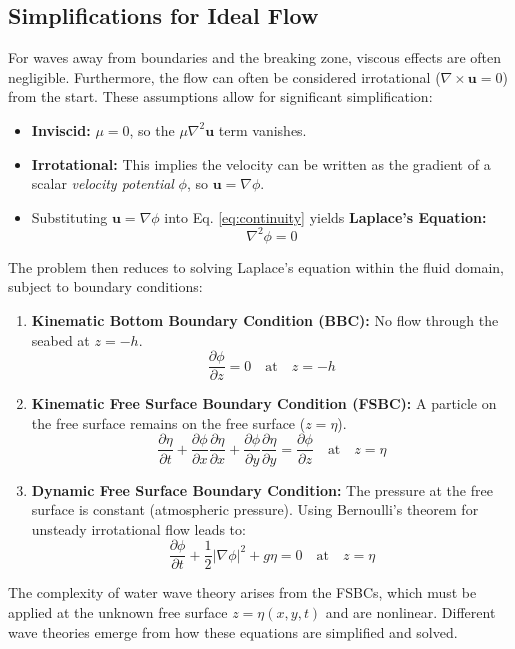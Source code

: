 \documentclass[11pt,a4paper]{article}
\begin{document}
\subsection{Simplifications for Ideal Flow}
For waves away from boundaries and the breaking zone, viscous effects are often negligible. Furthermore, the flow can often be considered irrotational ($\nabla \times \mathbf{u} = 0$) from the start. These assumptions allow for significant simplification:
\begin{itemize}
    \item \textbf{Inviscid:} $\mu = 0$, so the $\mu \nabla^2 \mathbf{u}$ term vanishes.
    \item \textbf{Irrotational:} This implies the velocity can be written as the gradient of a scalar \emph{velocity potential} $\phi$, so $\mathbf{u} = \nabla \phi$.
    \item Substituting $\mathbf{u} = \nabla \phi$ into Eq. \ref{eq:continuity} yields \textbf{Laplace's Equation:}
        \begin{equation}
        \nabla^2 \phi = 0
        \label{eq:laplace}
        \end{equation}
\end{itemize}
The problem then reduces to solving Laplace's equation within the fluid domain, subject to boundary conditions:
\begin{enumerate}
    \item \textbf{Kinematic Bottom Boundary Condition (BBC):} No flow through the seabed at $z = -h$.
        \begin{equation}
        \frac{\partial \phi}{\partial z} = 0 \quad \text{at} \quad z = -h
        \end{equation}
    \item \textbf{Kinematic Free Surface Boundary Condition (FSBC):} A particle on the free surface remains on the free surface ($z = \eta$).
        \begin{equation}
        \frac{\partial \eta}{\partial t} + \frac{\partial \phi}{\partial x}\frac{\partial \eta}{\partial x} + \frac{\partial \phi}{\partial y}\frac{\partial \eta}{\partial y} = \frac{\partial \phi}{\partial z} \quad \text{at} \quad z = \eta
        \end{equation}
    \item \textbf{Dynamic Free Surface Boundary Condition:} The pressure at the free surface is constant (atmospheric pressure). Using Bernoulli's theorem for unsteady irrotational flow leads to:
        \begin{equation}
        \frac{\partial \phi}{\partial t} + \frac{1}{2}|\nabla \phi|^2 + g\eta = 0 \quad \text{at} \quad z = \eta
        \end{equation}
\end{enumerate}
The complexity of water wave theory arises from the FSBCs, which must be applied at the unknown free surface $z=\eta(x,y,t)$ and are nonlinear. Different wave theories emerge from how these equations are simplified and solved.
\end{document}
